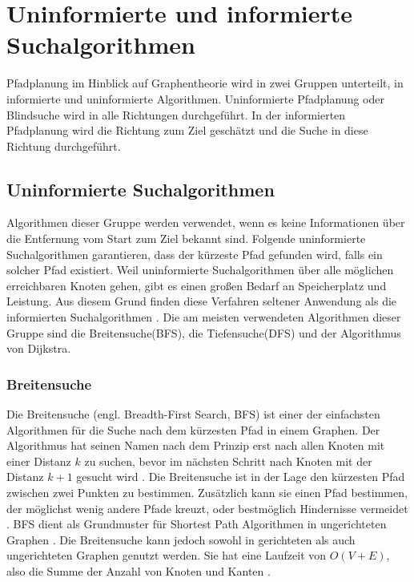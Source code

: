 \chapter{Uninformierte und informierte Suchalgorithmen}

Pfadplanung im Hinblick auf Graphentheorie wird in zwei Gruppen unterteilt, in informierte und uninformierte Algorithmen. Uninformierte Pfadplanung oder Blindsuche wird in alle Richtungen durchgeführt. In der informierten Pfadplanung wird die Richtung zum Ziel geschätzt und die Suche in diese Richtung durchgeführt\cite{comAnal}.

\section{Uninformierte Suchalgorithmen}
Algorithmen dieser Gruppe werden verwendet, wenn es keine Informationen über die Entfernung vom Start zum Ziel bekannt sind. Folgende uninformierte Suchalgorithmen garantieren, dass der kürzeste Pfad gefunden wird, falls ein solcher Pfad existiert\cite{comAnal}. Weil uninformierte Suchalgorithmen über alle möglichen erreichbaren Knoten gehen, gibt es einen großen Bedarf an Speicherplatz und Leistung. Aus diesem Grund finden diese Verfahren seltener Anwendung als die informierten Suchalgorithmen\cite{sim} \cite{comAnal}. Die am meisten verwendeten Algorithmen dieser Gruppe sind die Breitensuche(BFS), die Tiefensuche(DFS) und der Algorithmus von Dijkstra.

\subsection{Breitensuche}

Die Breitensuche (engl. Breadth-First Search, BFS) ist einer der einfachsten Algorithmen für die Suche nach dem kürzesten Pfad in einem Graphen. Der Algorithmus hat seinen Namen nach dem Prinzip erst nach allen Knoten mit einer Distanz $k$ zu suchen, bevor im nächsten Schritt nach Knoten mit der Distanz $k + 1$ gesucht wird \cite{Cormen.2009}. Die Breitensuche ist in der Lage den kürzesten Pfad zwischen zwei Punkten zu bestimmen. Zusätzlich kann sie einen Pfad bestimmen, der möglichst wenig andere Pfade kreuzt, oder bestmöglich Hindernisse vermeidet \cite{Lee.1961}. BFS dient als Grundmuster für Shortest Path Algorithmen in ungerichteten Graphen \cite{Ottmann.2017}. Die Breitensuche kann jedoch sowohl in gerichteten als auch ungerichteten Graphen genutzt werden. Sie hat eine Laufzeit von $O(V + E)$, also die Summe der Anzahl von Knoten und Kanten \cite{Cormen.2009}.


